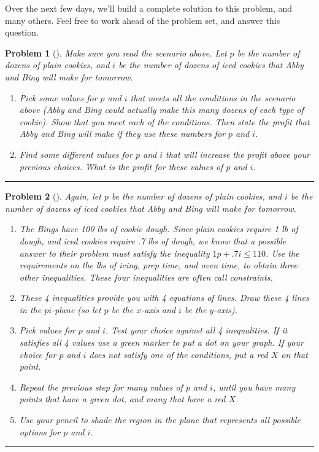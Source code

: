 \documentclass[letterpaper,oneside]{book}%
\theoremstyle{plain}
\theoremstyle{box}
\theoremstyle{problem}
\newtheorem{problemnum}{Problem}[chapter]
\newenvironment{problem}[1][]{\begin{problemnum}[#1]}{\end{problemnum}\nopagebreak\hrule\bigskip}
\begin{document}
Over the next few days, we'll build a complete solution to this problem, and many others. Feel free to work ahead of the problem set, and answer this question.


\begin{problem}
Make sure you read the scenario above. 
Let $p$ be the number of dozens of plain cookies, and $i$ be the number of dozens of iced cookies that Abby and Bing will make for tomorrow.
\begin{enumerate}
 \item Pick some values for $p$ and $i$ that meets all the conditions in the scenario above (Abby and Bing could actually make this many dozens of each type of cookie). Show that you meet each of the conditions. Then state the profit that Abby and Bing will make if they use these numbers for $p$ and $i$. 
 \item Find some different values for $p$ and $i$ that will increase the profit above your previous choices. What is the profit for these values of $p$ and $i$.  
\end{enumerate}
\end{problem}

\begin{problem}
Again, let $p$ be the number of dozens of plain cookies, and $i$ be the number of dozens of iced cookies that Abby and Bing will make for tomorrow.
\begin{enumerate}
 \item The Bings have 100 lbs of cookie dough.  Since plain cookies require 1 lb of dough, and iced cookies require .7 lbs of dough, we know that a possible answer to their problem must satisfy the inequality $1p+.7i\leq 110$. Use the requirements on the lbs of icing, prep time, and oven time, to obtain three other inequalities. These four inequalities are often call constraints. 
 \item These 4 inequalities provide you with 4 equations of lines.  Draw these 4 lines in the $pi$-plane (so let $p$ be the $x$-axis and $i$ be the $y$-axis).
 \item Pick values for $p$ and $i$.  Test your choice against all 4 inequalities.  If it satisfies all 4 values use a green marker to put a dot on your graph. If your choice for $p$ and $i$ does not satisfy one of the conditions, put a red $X$ on that point.  
 \item Repeat the previous step for many values of $p$ and $i$, until you have many points that have a green dot, and many that have a red $X$.
 \item Use your pencil to shade the region in the plane that represents all possible options for $p$ and $i$. 
\end{enumerate}
\end{problem}
\end{document}
